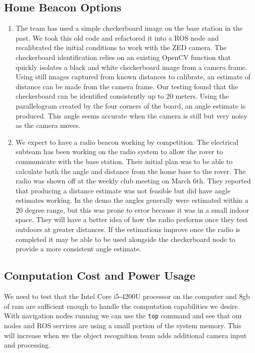 \documentclass[10pt, oneside,onecolumn]{IEEEtran}
\begin{document}
\subsection{Home Beacon Options}
\begin{enumerate}
\item The team has used a simple checkerboard image on the base station in the past. We took this old code and refactored it into a ROS node and recalibrated the initial conditions to work with the ZED camera. The checkerboard identification relies on an existing OpenCV function that quickly isolates a black and white checkerboard  image from a camera frame. Using still images captured from known distances to calibrate, an estimate of distance can be made from the camera frame. Our testing found that the checkerboard can be identified consistently up to 20 meters. Using the parallelogram created by the four corners of the board, an angle estimate is produced. This angle seems accurate when the camera is still but very noisy as the camera moves. 

\item We expect to have a radio beacon working by competition. The electrical subteam has been working on the radio system to allow the rover to communicate with the base station. Their initial plan was to be able to calculate both the angle and distance from the home base to the rover. The radio was shown off at the weekly club meeting on March 6th. They reported that producing a distance estimate was not feasible but did have angle estimates working. In the demo the angles generally were estimated within a 20 degree range, but this was prone to error because it was in a small indoor space. They will have a better idea of how the radio performs once they test outdoors at greater distances. If the estimations improve once the radio is completed it may be able to be used alongside the checkerboard node to provide a more consistent angle estimate. 
\end{enumerate}

\subsection{Computation Cost and Power Usage}
We need to test that the Intel Core i5-4200U processor on the computer and 8gb of ram are sufficient enough to handle the computation capabilities we desire. With navigation nodes running we can use the \texttt{top} command and see that our nodes and ROS services are using a small portion of the system memory. This will increase when we the object recognition team adds additional camera input and processing.
\end{document}
